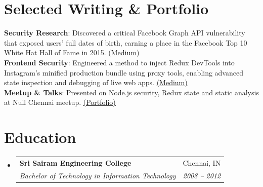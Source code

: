 \documentclass[letterpaper,11pt]{article}
\makeatletter
\newcommand{\resumeSubheading}[4]{
  \vspace{-1pt}\item
    \begin{tabular*}{0.97\textwidth}[t]{l@{\extracolsep{\fill}}r}
      \textbf{#1} & #2 \\
      \textit{\small#3} & \textit{\small #4} \\
    \end{tabular*}\vspace{-5pt}
}
\newcommand{\resumeSubHeadingListStart}{\begin{itemize}[leftmargin=0.15in, label={}]}
\newcommand{\resumeSubHeadingListEnd}{\end{itemize}}
\makeatother
\begin{document}
\section{Selected Writing \& Portfolio}
 \begin{itemize}[leftmargin=0.15in, label={}]
    \small{\item{
     \textbf{Security Research}: Discovered a critical Facebook Graph API vulnerability that exposed users' full dates of birth, earning a place in the Facebook Top 10 White Hat Hall of Fame in 2015. \href{https://medium.com/@rajsek/my-3rd-facebook-bounty-hat-trick-chennai-tcs-er-name-listed-in-facebook-hall-of-fame-47f57f2a4f71??utm_source=resume&utm_medium=article&utm_campaign=job_search}{\underline{(Medium)}} \\
     \textbf{Frontend Security}: Engineered a method to inject Redux DevTools into Instagram’s minified production bundle using proxy tools, enabling advanced state inspection and debugging of live web apps. \href{https://medium.com/@rajsek/hacky-way-to-viewing-instagram-redux-actions-b6ae59cbafc8?utm_source=resume&utm_medium=article&utm_campaign=job_search}{\underline{(Medium)}} \\
     \textbf{Meetup \& Talks}: Presented on Node.js security, Redux state and static analysis at Null Chennai meetup. \href{https://www.null.community/profile/4432-rajsek/}{\underline{(Portfolio)}}
    }}
 \end{itemize}


\section{Education}
  \resumeSubHeadingListStart
    \resumeSubheading
      {Sri Sairam Engineering College}{Chennai, IN}
      {Bachelor of Technology in Information Technology}{2008 -- 2012}
  \resumeSubHeadingListEnd
\end{document}
